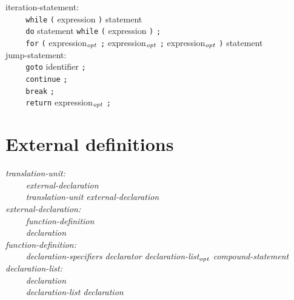 \documentclass[12pt]{report}
\def\|{\verb|}
\newcommand\opt{$_{{\it opt}}$ }
\begin{document}
\noindent
iteration-statement:\\
\|    | \verb+while+ \verb+(+ expression \verb+)+ statement\\
\|    | \verb+do+ statement \verb+while+ \verb+(+ expression \verb+)+ \verb+;+\\
\|    | \verb+for+ \verb+(+ expression\opt \verb+;+ expression\opt \verb+;+ expression\opt \verb+)+ statement\\

\noindent
jump-statement:\\
\|    | \verb+goto+ identifier \verb+;+\\
\|    | \verb+continue+ \verb+;+\\
\|    | \verb+break+ \verb+;+\\
\|    | \verb+return+ expression\opt \verb+;+\\

\rm
\section{External definitions}
\it
\noindent
translation-unit:\\
\|    | external-declaration\\
\|    | translation-unit external-declaration\\

\noindent
external-declaration:\\
\|    | function-definition\\
\|    | declaration\\

\noindent
function-definition:\\
\|    | declaration-specifiers declarator declaration-list\opt compound-statement\\

\noindent
declaration-list:\\
\|    | declaration\\
\|    | declaration-list declaration\\
\end{document}
